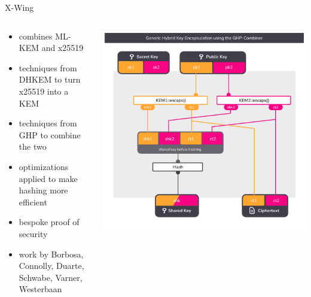 \begin{frame}{X-Wing \citeXwing}
  \begin{columns}[c]
    \begin{column}{.4\linewidth}
      \small
      \begin{itemize}
        \item combines ML-KEM and x25519
        \item techniques from DHKEM to turn x25519 into a KEM
        \item techniques from GHP to combine the two
        \item optimizations applied to make hashing more efficient
        \item bespoke proof of security
        \item work by Borbosa, Connolly, Duarte, Schwabe, Varner, Westerbaan
      \end{itemize}
    \end{column}
    \begin{column}{.55\linewidth}
      \includegraphics[width=\linewidth,page=3,clip=true,trim={29 43  29 58}]{graphics/rosenpass-encapsulation-combiner.pdf}
    \end{column}

  \end{columns}
\end{frame}

